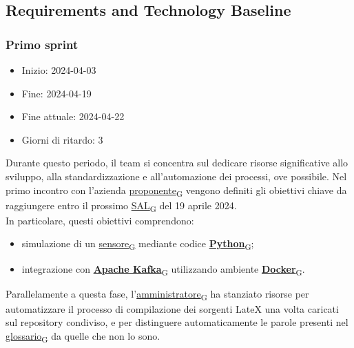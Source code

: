 \subsection{Requirements and Technology Baseline}
\subsubsection{Primo sprint}
\begin{itemize}
	\item Inizio: 2024-04-03
	\item Fine: 2024-04-19
	\item Fine attuale: 2024-04-22
	\item Giorni di ritardo: 3
\end{itemize}

Durante questo periodo, il team si concentra sul dedicare risorse significative allo sviluppo, alla standardizzazione e all'automazione dei processi, ove possibile. Nel primo incontro con l'azienda \href{https://7last.github.io/docs/rtb/documentazione-interna/glossario\#proponente}{proponente\textsubscript{G}} vengono definiti gli obiettivi chiave da raggiungere entro il prossimo \href{https://7last.github.io/docs/rtb/documentazione-interna/glossario\#stato-avanzamento-lavori}{SAL\textsubscript{G}} del 19 aprile 2024. \\
In particolare, questi obiettivi comprendono:
\begin{itemize}
	\item simulazione di un \href{https://7last.github.io/docs/rtb/documentazione-interna/glossario\#sensore}{sensore\textsubscript{G}} mediante codice \href{https://7last.github.io/docs/rtb/documentazione-interna/glossario\#python}{\textbf{Python}\textsubscript{G}};
	\item integrazione con \href{https://7last.github.io/docs/rtb/documentazione-interna/glossario\#apache-kafka}{\textbf{Apache Kafka}\textsubscript{G}} utilizzando ambiente \href{https://7last.github.io/docs/rtb/documentazione-interna/glossario\#docker}{\textbf{Docker}\textsubscript{G}}.
\end{itemize}
Parallelamente a questa fase, l'\href{https://7last.github.io/docs/rtb/documentazione-interna/glossario\#amministratore}{amministratore\textsubscript{G}} ha stanziato risorse per automatizzare il processo di compilazione dei sorgenti LateX una volta caricati sul repository condiviso, e per distinguere automaticamente le parole presenti nel \href{https://7last.github.io/docs/rtb/documentazione-interna/glossario#glossario}{glossario\textsubscript{G}} da quelle che non lo sono.

